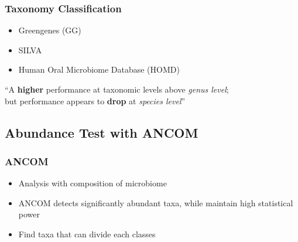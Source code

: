 \documentclass{beamer}
\begin{document}
    \begin{frame}
        \frametitle{Taxonomy Classification}

        \begin{itemize}
            \item Greengenes (GG) \cite{greengenes1}
            \item SILVA \cite{silva1, silva2}
            \item Human Oral Microbiome Database (HOMD)
        \end{itemize}

        “A \textbf{higher} performance at taxonomic levels above \textit{genus level}; \\
        but performance appears to \textbf{drop} at \textit{species level}” \cite{performance1}
    \end{frame}

    \subsection{Abundance Test with ANCOM}
    \begin{frame}
        \frametitle{ANCOM}

        \begin{itemize}
            \item Analysis with composition of microbiome \cite{ANCOM1}
            \item ANCOM detects significantly abundant taxa, while maintain high statistical power
            \item Find taxa that can divide each classes
        \end{itemize}
    \end{frame}
\end{document}
